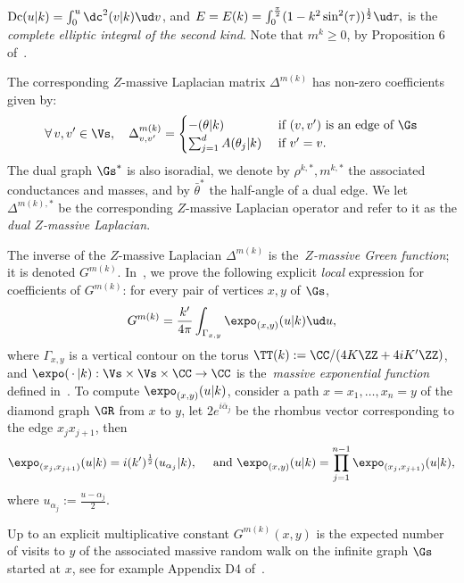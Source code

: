 \documentclass[a4paper,twoside,11pt]{article}
\begin{document}
$\mathrm{Dc}(u|k)=\int_{0}^u \dc^2(v|k)\ud v$, and
$E=E(k)=\int_{0}^{\frac{\pi}{2}} (1-k^2\sin^2(\tau))^{\frac{1}{2}}\ud\tau,$ is the \emph{complete elliptic integral of the second kind}.
Note that $m^k\geq 0$, by Proposition 6 of~\cite{BdTR1}.

The corresponding $Z$-massive Laplacian matrix $\Delta^{m(k)}$ has non-zero coefficients given by:
\begin{equation}\label{equ:defLap}
\forall\,v,v'\in \Vs,\quad \Delta^{m(k)}_{v,v'}=
\begin{cases}
-\sc(\theta|k)&\text{ if $(v,v')$ is an edge of $\Gs$}\\
\sum_{j=1}^d A(\theta_j|k)&\text{ if $v'=v$}.
\end{cases}
\end{equation}
The dual graph $\Gs^*$ is also isoradial, we denote by $\rho^{k,*}, m^{k,*}$ the associated conductances and masses, and by  
 $\bar{\theta}^*$ the half-angle of a dual edge.
We let $\Delta^{m(k),*}$ be the corresponding $Z$-massive Laplacian operator and refer to it as the \emph{dual $Z$-massive Laplacian}.

The inverse of the $Z$-massive Laplacian $\Delta^{m(k)}$ is the~\emph{$Z$-massive Green function}; it
is denoted $G^{m(k)}$. In~\cite{BdTR1}, we prove the following explicit \emph{local} expression for coefficients of $G^{m(k)}$: 
for every pair of vertices $x,y$ of $\Gs$, 
\begin{equation}\label{equ:massiv_Green}
G^{m(k)}=\frac{k'}{4\pi}\int_{\Gamma_{x,y}} \expo_{(x,y)}(u|k)\ud u, 
\end{equation}
where $\Gamma_{x,y}$ is a vertical contour on the torus $\TT(k):=\CC/(4K\ZZ+4iK'\ZZ)$, and
$\expo(\, \cdot\, |k):\Vs\times\Vs\times\CC\rightarrow \CC$ is the~\emph{massive exponential function} defined in~\cite{BdTR1}. To compute
$\expo_{(x,y)}(u|k)$, consider a path $x=x_1,\dots,x_n=y$ of the diamond graph $\GR$ from $x$ to $y$, let $2e^{i\bar{\alpha}_j}$ be
the rhombus vector corresponding to the edge $x_jx_{j+1}$, then
\begin{equation}\label{equ:expo_function}
\expo_{(x_j,x_{j+1})}(u|k)=i(k')^{\frac{1}{2}}\sc(u_{\alpha_j}|k),\quad \text{ and } \expo_{(x,y)}(u|k)=\prod_{j=1}^{n-1}\expo_{(x_j,x_{j+1})}(u|k),
\end{equation}
where $u_{\alpha_j}:=\frac{u-\alpha_j}{2}$.

Up to an explicit multiplicative constant $G^{m(k)}(x,y)$ is the expected number of visits to $y$
of the associated massive random walk on the infinite graph $\Gs$ started at $x$, see for example Appendix D4 of~\cite{BdTR1}.
\end{document}
